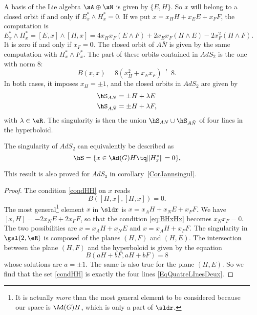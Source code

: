 A basis of the Lie algebra $\sA\oplus\sN$ is given by $\{E,H\}$. So $x$ will belong to a closed orbit if and only if $E_x^*\wedge H^*_x=0$. If we put $x=x_HH+x_EE+x_FF$, the computation is
\[
	E_x^*\wedge H^*_x=[E,x]\wedge[H,x]
	=4x_Hx_F (E\wedge F)+2x_Ex_F (H\wedge E)-2x_F^2 (H\wedge F).
\]
It is zero if and only if $x_F=0$. The closed orbit of $A\bar{N}$ is given by the same computation with $H^*_x\wedge F^*_x$. The part of these orbits contained in $AdS_2$ is the one with norm $8$:
\[
	B(x,x)=8(x_H^2+x_Ex_F)\stackrel{!}{=}8.
\]
In both cases, it imposes $x_H=\pm 1$, and the closed orbits in $AdS_2$ are given by
\begin{subequations}\label{EqQuatreLInesDeux}
	\begin{align}
		\hS_{AN}      & =\pm H+\lambda E  \\
		\hS_{A\bar N} & =\pm H+\lambda F,
	\end{align}
\end{subequations}
with $\lambda\in\eR$. The singularity is then the union $\hS_{AN}\cup\hS_{A\bar N}$ of four lines in the hyperboloid.

\begin{proposition} \label{PropAdSDeuxJannule}
	The singularity of $AdS_2$ can equivalently be described as
	\begin{equation}\label{condHH}
		\hS=\{x \in \Ad(G)H \tq \|H^*_x\|=0\},
	\end{equation}
\end{proposition}
This result is also proved for \( AdS_3\) in corollary~\ref{CorJannsingul}.

\begin{proof}
	The condition \eqref{condHH} on $x$ reads
	\begin{equation}\label{eq:BHxHx}
		B([H,x],[H,x])=0.
	\end{equation}
	The most general\footnote{It is actually \emph{more} than the most general element to be considered because our space is $\Ad(G)H$, which is only a part of $\sldr$.} element $x$ in $\sldr$ is $x=x_AH+x_NE+x_FF$. We have $[x,H]=-2x_NE+2x_FF$, so that the condition \eqref{eq:BHxHx} becomes $x_Nx_F=0$. The two possibilities are $x=x_AH+x_NE$ and $x=x_AH+x_FF$. The singularity in $\gsl(2,\eR)$ is composed of the planes $(H,F)$ and $(H,E)$. The intersection between the plane $(H,F)$ and the hyperboloid is given by the equation
	\[
		B(aH+bF,aH+bF)=8
	\]
	whose solutions are $a=\pm 1$. The same is also true for the plane $(H,E)$. So we find that the set \eqref{condHH} is exactly the four lines  \eqref{EqQuatreLInesDeux}.

\end{proof}

